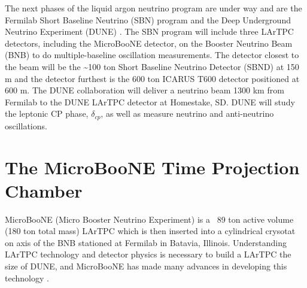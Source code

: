 The next phases of the liquid argon neutrino program are under way and are the Fermilab Short Baseline Neutrino (SBN) program \cite{sbn} and the Deep Underground Neutrino Experiment (DUNE) \cite{dune}. The SBN program will include three LArTPC detectors, including the MicroBooNE detector, on the Booster Neutrino Beam (BNB) to do multiple-baseline oscillation measurements. The detector closest to the beam will be the \sim 100 ton Short Baseline Neutrino Detector (SBND)\cite{sbnd} at 150 m and the detector furthest is the 600 ton ICARUS T600 \cite{icarus_t600} detector positioned at 600 m. The DUNE collaboration will deliver a neutrino beam 1300 km from Fermilab to the DUNE LArTPC detector at Homestake, SD. DUNE will study the leptonic CP phase, $\delta_{cp}$, as well as measure neutrino and anti-neutrino oscillations. 
\section{The MicroBooNE Time Projection Chamber}
MicroBooNE \cite{microboone}(Micro Booster Neutrino Experiment) is a ~89 ton active volume (180 ton total mass) LArTPC which is then inserted into a cylindrical crysotat on axis of the BNB stationed at Fermilab in Batavia, Illinois. Understanding LArTPC technology and detector physics is necessary to build a LArTPC the size of DUNE, and MicroBooNE has made many advances in developing this technology\cite{noisechar} \cite{michel}. 

